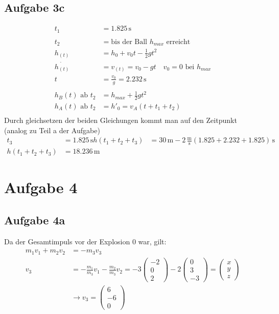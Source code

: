 \documentclass[a4paper,10pt]{extarticle}
\begin{document}
  \subsection*{Aufgabe 3c}
  \begin{align*}
  t_1 &= 1.825 \, \mbox{s} \\ \\
  t_2 &= \mbox{bis der Ball $h_{max}$ erreicht} \\
  h_{(t)} &= h_0 + v_0t - \frac{1}{2}gt^2 \\
  \dot{h_{(t)}} &= v_{(t)} = v_0 - gt \quad v_0 = 0 \mbox{ bei } h_{max} \\
  t &= \frac{v_0}{g} = 2.232 \, \mbox{s} \\ \\
  h_B{(t)} \mbox{ ab } t_2 &= h_{max} + \frac{1}{2}gt^2 \\
  h_A{(t)} \mbox{ ab } t_2 &= h'_0 = v_A(t + t_1 + t_2) \\
  \end{align*}
  Durch gleichsetzen der beiden Gleichungen kommt man auf den Zeitpunkt (analog zu Teil a der Aufgabe)
  \begin{align*}
  t_3 &= 1.825 \, \mbox{s}
  h{(t_1 + t_2 + t_3)} &= 30 \, \mbox{m} - 2 \, \frac{\mbox{m}}{\mbox{s}} (1.825 + 2.232 + 1.825)\, \mbox{s} \\
  h{(t_1 + t_2 + t_3)} &= 18.236 \, \mbox{m}
  \end{align*}
\section*{Aufgabe 4}
  \subsection*{Aufgabe 4a}
  Da der Gesamtimpuls vor der Explosion $0$ war, gilt:
  \begin{align*}
  m_1 v_1 + m_2 v_2 &= - m_3 v_3 \\
  v_3 &= - \frac{m_1}{m_3} v_1 - \frac{m_2}{m_3} v_2 = -3 \begin{pmatrix} -2 \\ 0 \\ 2 \end{pmatrix} -2 \begin{pmatrix} 0 \\ 3 \\ -3 \end{pmatrix} = \begin{pmatrix} x \\ y \\ z \end{pmatrix} \\
  &\rightarrow v_3 = \begin{pmatrix} 6 \\ -6 \\ 0 \end{pmatrix}
  \end{align*}
\end{document}
